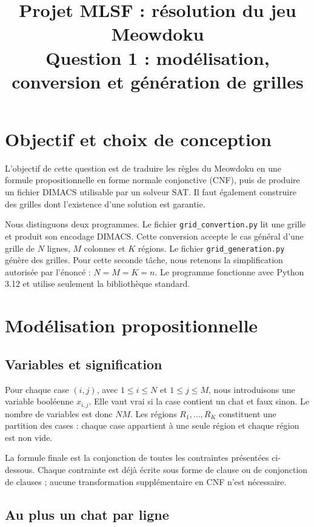 \documentclass[11pt,a4paper]{article}
\title{Projet MLSF : résolution du jeu Meowdoku\\
  \large Question 1 : modélisation, conversion et génération de grilles}
\author{}
\date{}
\begin{document}
\maketitle

\section{Objectif et choix de conception}

L'objectif de cette question est de traduire les règles du Meowdoku en une
formule propositionnelle en forme normale conjonctive (CNF), puis de produire
un fichier DIMACS utilisable par un solveur SAT. Il faut également construire
des grilles dont l'existence d'une solution est garantie.

Nous distinguons deux programmes. Le fichier \texttt{grid\_convertion.py}
lit une grille et produit son encodage DIMACS. Cette conversion accepte le
cas général d'une grille de $N$ lignes, $M$ colonnes et $K$ régions.
Le fichier \texttt{grid\_generation.py} génère des grilles. Pour cette seconde
tâche, nous retenons la simplification autorisée par l'énoncé :
$N=M=K=n$. Le programme fonctionne avec Python 3.12 et utilise seulement
la bibliothèque standard.

\section{Modélisation propositionnelle}

\subsection{Variables et signification}

Pour chaque case $(i,j)$, avec $1\leq i\leq N$ et $1\leq j\leq M$, nous
introduisons une variable booléenne $x_{i,j}$. Elle vaut vrai si la case
contient un chat et faux sinon. Le nombre de variables est donc $NM$.
Les régions $R_1,\ldots,R_K$ constituent une partition des cases : chaque
case appartient à une seule région et chaque région est non vide.

La formule finale est la conjonction de toutes les contraintes présentées
ci-dessous. Chaque contrainte est déjà écrite sous forme de clause ou de
conjonction de clauses ; aucune transformation supplémentaire en CNF n'est
nécessaire.

\subsection{Au plus un chat par ligne}
\end{document}
